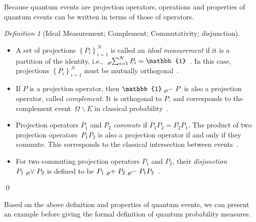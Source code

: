 \documentclass{article}
\theoremstyle{remark}
\newtheorem{definition}{Definition}
\begin{document}
Because quantum events are projection operators, operations and properties
of quantum events can be written in terms of those of operators.

\begin{definition}[Ideal Measurement; Complement; Commutativity;
disjunction]~ 
\begin{itemize}
\item A set of projections $\left\{ P_{i}\right\} _{i=1}^{N}$ is called
an \emph{ideal measurement} if it is a partition of the identity,
i.e., $\tensor*[_{\mathscr{O}}]{\sum}{_{i=1}^{N}}P_{i}=\mathbb{1}$~\cite{Swart2013}.
In this case, projections $\left\{ P_{i}\right\} _{i=1}^{N}$ must
be mutually orthogonal~\cite{Griffiths2003}.
\item If $P$ is a projection operator, then $\mathbb{1}\tensor*[_{\mathscr{O}}]{-}{}P$
is also a projection operator, called \emph{complement}. It is orthogonal
to $P$, and corresponds to the complement event~$\Omega\backslash E$
in classical probability~\cite{Griffiths2003}. 
\item Projection operators $P_{1}$ and $P_{2}$ \emph{commute} if $P_{1}P_{2}=P_{2}P_{1}$.
The product of two projection operators~$P_{1}P_{2}$ is also a projection
operator if and only if they commute. This corresponds to the classical
intersection between events~\cite{peres1995quantum,Griffiths2003}. 
\item For two commuting projection operators $P_{1}$ and $P_{2}$, their
\emph{disjunction}~$P_{1}\tensor*[_{\mathscr{O}}]{\vee}{}P_{2}$
is defined to be $P_{1}\tensor*[_{\mathscr{O}}]{+}{}P_{2}\tensor*[_{\mathscr{O}}]{-}{}P_{1}P_{2}$~\cite{Griffiths2003}. 
\end{itemize}
\qed\end{definition}

Based on the above definition and properties of quantum events, we
can present an example before giving the formal definition of quantum
probability measures.
\end{document}
